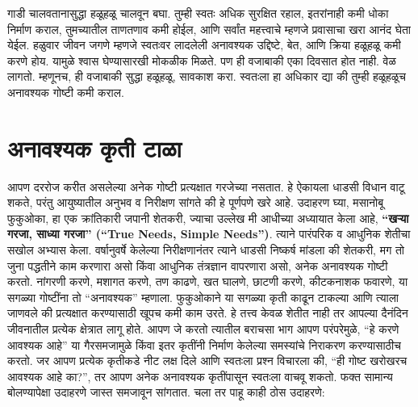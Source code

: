 गाडी चालवतानासुद्धा हळूहळू चालवून बघा. तुम्ही स्वतः अधिक सुरक्षित रहाल, इतरांनाही कमी धोका निर्माण कराल, तुमच्यातील ताणतणाव कमी होईल, आणि सर्वांत महत्त्वाचे म्हणजे प्रवासाचा खरा आनंद घेता येईल.
हळुवार जीवन जगणे म्हणजे स्वतःवर लादलेली अनावश्यक उद्दिष्टे, बेत, आणि क्रिया हळूहळू कमी करणे होय. यामुळे श्वास घेण्यासारखी मोकळीक मिळते. पण ही वजाबाकी एका दिवसात होत नाही. वेळ लागतो. म्हणूनच, ही वजाबाकी सुद्धा हळूहळू, सावकाश करा. स्वतःला हा अधिकार द्या की तुम्ही हळूहळूच अनावश्यक गोष्टी कमी कराल.


 \chapter{अनावश्यक कृती टाळा}
आपण दररोज करीत असलेल्या अनेक गोष्टी प्रत्यक्षात गरजेच्या नसतात. हे ऐकायला धाडसी विधान वाटू शकते, परंतु आयुष्यातील अनुभव व निरीक्षण सांगते की हे पूर्णपणे खरे आहे.
उदाहरण घ्या,  मसानोबू फुकुओका, हा एक क्रांतिकारी जपानी शेतकरी, ज्याचा उल्लेख मी आधीच्या अध्यायात केला आहे,  \textbf{``खऱ्या गरजा, साध्या गरजा'' (``True Needs, Simple Needs'')}. त्याने पारंपरिक व आधुनिक शेतीचा सखोल अभ्यास केला. वर्षानुवर्षे केलेल्या निरीक्षणानंतर त्याने धाडसी निष्कर्ष मांडला की शेतकरी, मग तो जुना पद्धतीने काम करणारा असो किंवा आधुनिक तंत्रज्ञान वापरणारा असो, अनेक अनावश्यक गोष्टी करतो.
नांगरणी करणे, मशागत करणे, तण काढणे, खत घालणे, छाटणी करणे, कीटकनाशक फवारणे,  या सगळ्या गोष्टींना तो ``अनावश्यक'' म्हणाला. फुकुओकाने या सगळ्या कृती काढून टाकल्या आणि त्याला जाणवले की प्रत्यक्षात करण्यासाठी खूपच कमी काम उरते.
हे तत्त्व केवळ शेतीत नाही तर आपल्या दैनंदिन जीवनातील प्रत्येक क्षेत्रात लागू होते. आपण जे करतो त्यातील बराचसा भाग आपण परंपरेमुळे, ``हे करणे आवश्यक आहे'' या गैरसमजामुळे किंवा इतर कृतींनी निर्माण केलेल्या समस्यांचे निराकरण करण्यासाठीच करतो. जर आपण प्रत्येक कृतीकडे नीट लक्ष दिले आणि स्वतःला प्रश्न विचारला की,  ``ही गोष्ट खरोखरच आवश्यक आहे का?'',  तर आपण अनेक अनावश्यक कृतींपासून स्वतःला वाचवू शकतो.
फक्त सामान्य बोलण्यापेक्षा उदाहरणे जास्त समजावून सांगतात. चला तर पाहू काही ठोस उदाहरणे:
